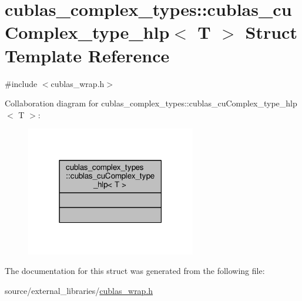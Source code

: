 \hypertarget{structcublas__complex__types_1_1cublas__cuComplex__type__hlp}{\section{cublas\-\_\-complex\-\_\-types\-:\-:cublas\-\_\-cu\-Complex\-\_\-type\-\_\-hlp$<$ T $>$ Struct Template Reference}
\label{structcublas__complex__types_1_1cublas__cuComplex__type__hlp}
}


{\ttfamily \#include $<$cublas\-\_\-wrap.\-h$>$}



Collaboration diagram for cublas\-\_\-complex\-\_\-types\-:\-:cublas\-\_\-cu\-Complex\-\_\-type\-\_\-hlp$<$ T $>$\-:\nopagebreak
\begin{figure}[H]
\begin{center}
\leavevmode
\includegraphics[width=210pt]{structcublas__complex__types_1_1cublas__cuComplex__type__hlp__coll__graph}
\end{center}
\end{figure}


The documentation for this struct was generated from the following file\-:\begin{DoxyCompactItemize}
\item 
source/external\-\_\-libraries/\hyperlink{cublas__wrap_8h}{cublas\-\_\-wrap.\-h}\end{DoxyCompactItemize}
